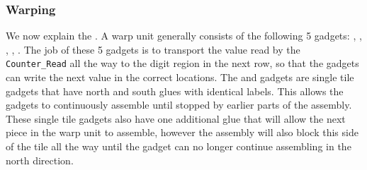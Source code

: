 \subsubsection{ Warping }

We now explain the {\warpunit}. A warp unit generally consists of the following 5 gadgets: \prewarp,
\firstwarp, \warpbridge, \secondwarp, \postwarp. The job of these 5 gadgets is to transport the value
read by the {\tt Counter\_Read} all the way to the digit region in the next row, so that the {\cwrite} gadgets
can write the next value in the correct locations. The {\firstwarp} and {\secondwarp} gadgets are single
tile gadgets that have north and south glues with identical labels. This allows the gadgets to continuously
assemble until stopped by earlier parts of the assembly. These single tile gadgets also have one additional glue
that will allow the next piece in the warp unit to assemble, however the assembly will also block this side of the tile
all the way until the gadget can no longer continue assembling in the north direction.

